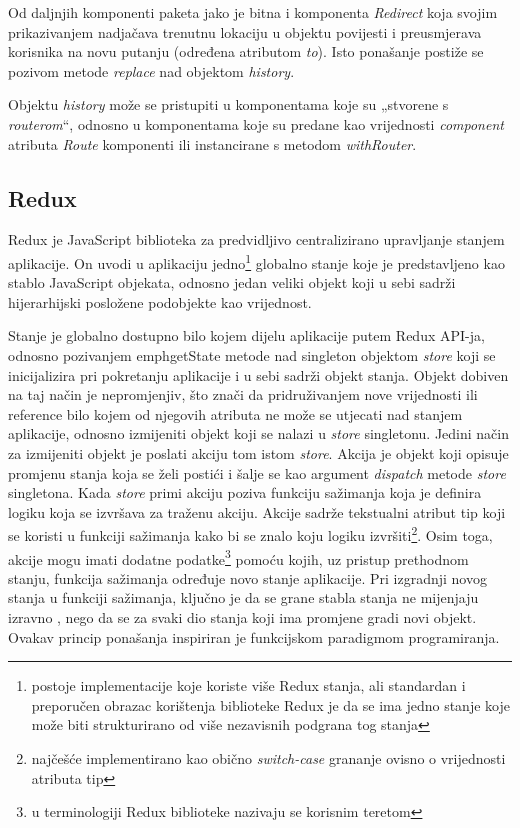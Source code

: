\documentclass[times, utf8, diplomski, numeric]{fer}
\newcommand{\razmaks}{\vspace{10pt}}
\begin{document}
Od daljnjih komponenti paketa jako je bitna i komponenta \emph{Redirect} koja svojim prikazivanjem nadjačava trenutnu lokaciju u objektu povijesti i preusmjerava korisnika na novu putanju (određena atributom \emph{to}).
Isto ponašanje postiže se pozivom metode \emph{replace} nad objektom \emph{history}.

Objektu \emph{history} može se pristupiti u komponentama koje su „stvorene s \emph{routerom}“, odnosno u komponentama koje su predane kao vrijednosti \emph{component} atributa \emph{Route} komponenti ili instancirane s metodom \emph{withRouter}.


\razmaks
\subsection{Redux}

Redux je JavaScript biblioteka za predvidljivo centralizirano upravljanje stanjem aplikacije.
On uvodi u aplikaciju jedno\footnote{
    postoje implementacije koje koriste više Redux stanja, ali standardan i preporučen obrazac korištenja biblioteke Redux je da se ima jedno stanje koje može biti strukturirano od više nezavisnih podgrana tog stanja
} globalno stanje koje je predstavljeno kao stablo JavaScript objekata, odnosno jedan veliki objekt koji u sebi sadrži hijerarhijski posložene podobjekte kao vrijednost.

Stanje je globalno dostupno bilo kojem dijelu aplikacije putem Redux API-ja, odnosno pozivanjem emph{getState} metode nad singleton objektom \emph{store} koji se inicijalizira pri pokretanju aplikacije i u sebi sadrži objekt stanja. 
Objekt dobiven na taj način je nepromjenjiv, što znači da pridruživanjem nove vrijednosti ili reference bilo kojem od njegovih atributa ne može se utjecati nad stanjem aplikacije, odnosno izmijeniti objekt koji se nalazi u \emph{store} singletonu.
Jedini način za izmijeniti objekt je poslati  akciju tom istom \emph{store}.
Akcija  je objekt koji opisuje promjenu stanja koja se želi postići i šalje se kao argument \emph{dispatch} metode \emph{store} singletona.
Kada \emph{store} primi akciju poziva funkciju sažimanja  koja je definira logiku koja se izvršava za traženu akciju.
Akcije sadrže tekstualni atribut tip  koji se koristi u funkciji sažimanja kako bi se znalo koju logiku izvršiti\footnote{
    najčešće implementirano kao obično \emph{switch-case} grananje ovisno o vrijednosti atributa tip
}.
Osim toga, akcije mogu imati dodatne podatke\footnote{
    u terminologiji Redux biblioteke nazivaju se korisnim teretom 
} pomoću kojih, uz pristup prethodnom stanju, funkcija sažimanja određuje novo stanje aplikacije.
Pri izgradnji novog stanja u funkciji sažimanja, ključno je da se grane stabla stanja ne mijenjaju izravno , nego da se za svaki dio stanja koji ima promjene gradi novi objekt.
Ovakav princip ponašanja inspiriran je funkcijskom paradigmom programiranja\citep{redux}.
\end{document}
